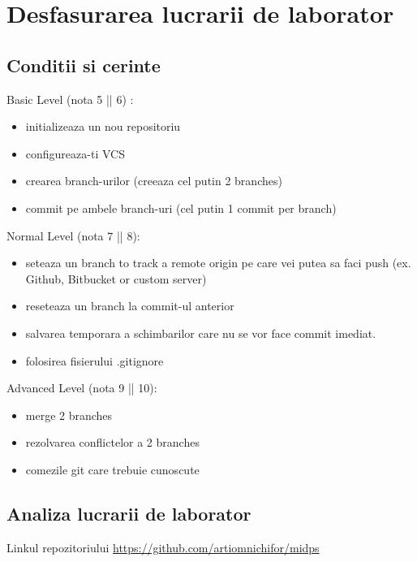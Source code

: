 \section{Desfasurarea lucrarii de laborator}

\subsection{Conditii si cerinte}

Basic Level (nota 5 || 6) :
\begin{itemize}
	\item initializeaza un nou repositoriu
	\item configureaza-ti VCS
	\item crearea branch-urilor (creeaza cel putin 2 branches)
	\item commit pe ambele branch-uri (cel putin 1 commit per branch)
\end{itemize}

Normal Level (nota 7 || 8):
\begin{itemize}
	\item seteaza un branch to track a remote origin pe care vei putea sa faci push (ex. Github, Bitbucket or custom server)
	\item reseteaza un branch la commit-ul anterior
	\item salvarea temporara a schimbarilor care nu se vor face commit imediat.
	\item folosirea fisierului .gitignore
\end{itemize}

Advanced Level (nota 9 || 10):
\begin{itemize}
	\item merge 2 branches
	\item rezolvarea conflictelor a 2 branches
	\item comezile git care trebuie cunoscute
\end{itemize}
\subsection{Analiza lucrarii de laborator}

	Linkul repozitoriului  \url{https://github.com/artiomnichifor/midps}

